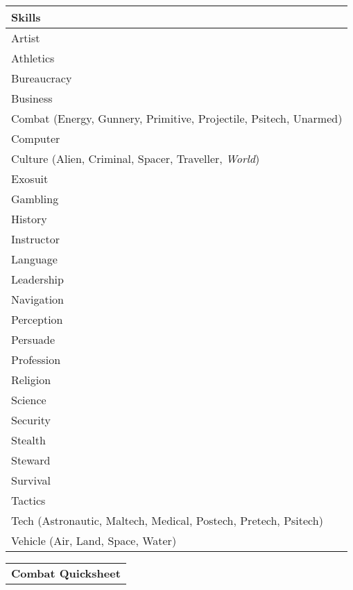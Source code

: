 \documentclass[10pt,letterpaper]{article}
\begin{document}
\begin{multicols}{3}
\begin{tabularx}{\columnwidth}{ | X | X | }
    \end{tabularx}
    \begin{tabularx}{\columnwidth}{ | X |}
        \hline
        \textbf{Skills} \\
        \hline
        Artist \\
        \hline
        Athletics \\
        \hline
        Bureaucracy \\
        \hline
        Business \\
        \hline
        Combat (Energy, Gunnery, Primitive, Projectile, Psitech, Unarmed) \\
        \hline
        Computer \\
        \hline
        Culture (Alien, Criminal, Spacer, Traveller, \textit{World}) \\
        \hline
        Exosuit \\
        \hline
        Gambling \\
        \hline
        History \\
        \hline
        Instructor \\
        \hline
        Language \\
        \hline
        Leadership \\
        \hline
        Navigation \\
        \hline
        Perception \\
        \hline
        Persuade \\
        \hline
        Profession \\
        \hline
        Religion \\
        \hline
        Science \\
        \hline
        Security \\
        \hline
        Stealth \\
        \hline
        Steward \\
        \hline
        Survival \\ 
        \hline
        Tactics \\
        \hline
        Tech (Astronautic, Maltech, Medical, Postech, Pretech, Psitech) \\
        \hline
        Vehicle (Air, Land, Space, Water) \\
        \hline
    \end{tabularx}
    \begin{tabularx}{\columnwidth}{ | X | X | }
        \hline
        \multicolumn{2}{|c|}{\textbf{Combat Quicksheet}} \\

\end{tabularx}
\end{multicols}
\end{document}
